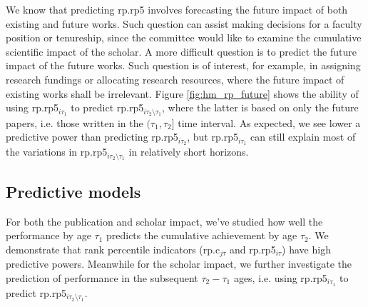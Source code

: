 We know that predicting rp.rp5 involves forecasting the future impact of both existing and future works. Such question can assist making decisions for a faculty position or tenureship, since the committee would like to examine the cumulative scientific impact of the scholar. A more difficult question is to predict the future impact of the future works. Such question is of interest, for example, in assigning research fundings or allocating research resources, where the future impact of existing works shall be irrelevant. Figure \ref{fig:hm_rp_future} shows the ability of using rp.rp5$_{i\tau_1}$ to predict rp.rp5$_{i\tau_2 \setminus \tau_1}$, where the latter is based on only the future papers, i.e. those written in the $(\tau_1,\tau_2]$ time interval. As expected, we see lower a predictive power than predicting rp.rp5$_{i\tau_2}$, but rp.rp5$_{i\tau_1}$ can still explain most of the variations in rp.rp5$_{i\tau_2 \setminus \tau_1}$ in relatively short horizons. 

\subsection*{Predictive models}
For both the publication and scholar impact, we've studied how well the performance by age $\tau_1$ predicts the cumulative achievement by age $\tau_2$. We demonstrate that rank percentile indicators (rp.c$_{j\tau}$ and rp.rp5$_{i\tau}$) have high predictive powers. Meanwhile for the scholar impact, we further investigate the prediction of performance in the subsequent $\tau_2-\tau_1$ ages, i.e. using rp.rp5$_{i\tau_1}$ to predict rp.rp5$_{i\tau_2 \setminus \tau_1}$. 

